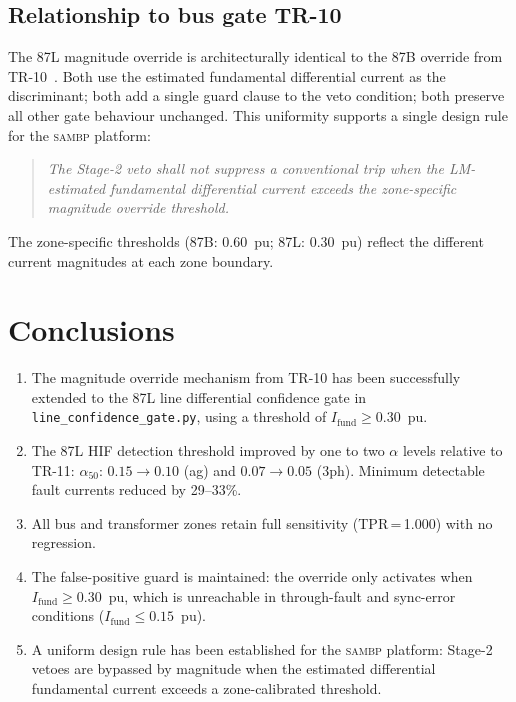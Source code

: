 \documentclass[11pt,a4paper]{article}
\newcommand{\sambp}{\textsc{sambp}}
\newcommand{\Ifund}{I_{\mathrm{fund}}}
\newcommand{\alphafifty}{\alpha_{50}}
\begin{document}
\subsection{Relationship to bus gate TR-10}

The 87L magnitude override is architecturally identical to the 87B override
from TR-10~\cite{SAMBP_TR10}.  Both use the estimated fundamental differential
current as the discriminant; both add a single guard clause to the veto
condition; both preserve all other gate behaviour unchanged.  This uniformity
supports a single design rule for the \sambp{} platform:

\begin{quotation}
  \noindent\emph{The Stage-2 veto shall not suppress a conventional trip when
  the LM-estimated fundamental differential current exceeds the zone-specific
  magnitude override threshold.}
\end{quotation}

The zone-specific thresholds (87B: 0.60~pu; 87L: 0.30~pu) reflect the
different current magnitudes at each zone boundary.

\section{Conclusions}
\label{sec:conclusions}

\begin{enumerate}
  \item The magnitude override mechanism from TR-10 has been successfully
        extended to the 87L line differential confidence gate in
        \texttt{line\_confidence\_gate.py}, using a threshold of
        $\Ifund \geq 0.30$~pu.
  \item The 87L HIF detection threshold improved by one to two $\alpha$
        levels relative to TR-11:
        $\alphafifty$: $0.15 \to 0.10$ (ag) and $0.07 \to 0.05$ (3ph).
        Minimum detectable fault currents reduced by 29--33\%.
  \item All bus and transformer zones retain full sensitivity (TPR\,=\,1.000)
        with no regression.
  \item The false-positive guard is maintained: the override only activates
        when $\Ifund \geq 0.30$~pu, which is unreachable in through-fault and
        sync-error conditions ($\Ifund \leq 0.15$~pu).
  \item A uniform design rule has been established for the \sambp{} platform:
        Stage-2 vetoes are bypassed by magnitude when the estimated
        differential fundamental current exceeds a zone-calibrated threshold.
\end{enumerate}
\end{document}
